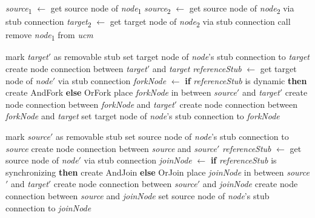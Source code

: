 \begin{algorithm}                     
	\begin{algorithmic}[1]
		
		 \label{alg:2.15}
			\State \emph{source}\textsubscript{1} $\gets$ get source node of \emph{node}\textsubscript{1}
			\State \emph{source}\textsubscript{2} $\gets$ get source node of \emph{node}\textsubscript{2} via stub connection
			\State \emph{target}\textsubscript{2} $\gets$ get target node of \emph{node}\textsubscript{2} via stub connection
			\State call 
			\State remove \emph{node}\textsubscript{1} from \emph{ucm}
		\EndFunction \label{alg:2.16}
		
			 \label{alg:2.17}
				\State mark \emph{target}$'$ as removable stub
				\State set target node of \emph{node}'s stub connection to \emph{target} \label{alg:2.18}
			 \label{alg:2.19}
				\State create node connection between \emph{target}$'$ and \emph{target} \label{alg:2.20}
			\Else \label{alg:2.21}
				\State \emph{referenceStub} $\gets$ get target node of \emph{node}$'$ via stub connection
				\State \emph{forkNode} $\gets$ \textbf{if} \emph{referenceStub} is dynamic \textbf{then} create {\cls AndFork} \textbf{else} {\cls OrFork}
				\State place \emph{forkNode} in between \emph{source}$'$ and \emph{target}$'$
				\State create node connection between \emph{forkNode} and \emph{target}$'$
				\State create node connection between \emph{forkNode} and \emph{target}
				\State set target node of \emph{node}'s stub connection to \emph{forkNode}
			\EndIf \label{alg:2.22}
		\EndFunction
		
			 \label{alg:2.23}
				\State mark \emph{source}$'$ as removable stub
				\State set source node of \emph{node}'s stub connection to \emph{source} \label{alg:2.24}
			 \label{alg:2.25}
				\State create node connection between \emph{source} and \emph{source}$'$ \label{alg:2.26}
			\Else \label{alg:2.27}
				\State \emph{referenceStub} $\gets$ get source node of \emph{node}$'$ via stub connection
				\State \emph{joinNode} $\gets$ \textbf{if} \emph{referenceStub} is synchronizing \textbf{then} create {\cls AndJoin} \textbf{else} {\cls OrJoin}
				\State place \emph{joinNode} in between \emph{source}$'$ and \emph{target}$'$
				\State create node connection between \emph{source}$'$ and \emph{joinNode}
				\State create node connection between \emph{source} and \emph{joinNode}
				\State set source node of \emph{node}'s stub connection to \emph{joinNode}
			\EndIf \label{alg:2.28}
		\EndFunction
	\end{algorithmic}
\end{algorithm}

